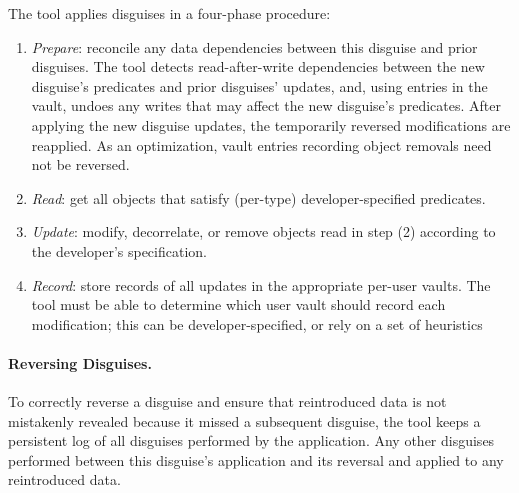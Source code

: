 The tool applies disguises in a four-phase procedure:
\begin{enumerate}
    \item \emph{Prepare}: reconcile any data dependencies between this disguise and prior disguises.
            The tool detects read-after-write dependencies between the new disguise's predicates and prior disguises'
            updates, and, using entries in the vault, undoes any writes that may affect the new disguise's predicates. After
            applying the new disguise updates, the temporarily reversed modifications are reapplied. As an
            optimization, vault entries recording object removals need not be reversed.
        \item \emph{Read}: get all objects that satisfy (per-type) developer-specified predicates.
        \item \emph{Update}: modify, decorrelate, or remove objects read in step (2) according to the
        developer's specification.
    \item \emph{Record}: store records of all updates in the appropriate per-user vaults. The tool
        must be able to determine which user vault should record each modification; this can be
        developer-specified, or rely on a set of heuristics 
\end{enumerate}

\paragraph{Reversing Disguises.}
To correctly reverse a disguise and ensure that reintroduced data is not mistakenly revealed because
it missed a subsequent disguise, the tool keeps a persistent log of all disguises performed by the 
application. Any other disguises performed between this disguise's application and its reversal and
applied to any reintroduced data.
